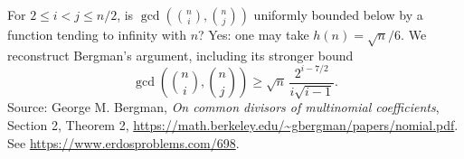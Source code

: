 For \(2\leq i<j\leq n/2\), is
\(\gcd(\binom ni,\binom nj)\) uniformly bounded below by a
function tending to infinity with \(n\)?
Yes: one may take \(h(n)=\sqrt n/6\).
We reconstruct Bergman's argument, including its stronger bound
\[
 \gcd\left(\binom ni,\binom nj\right)
 \geq\sqrt n\,\frac{2^{i-7/2}}{i\sqrt{i-1}}.
\]
Source: George M. Bergman, \emph{On common divisors of multinomial
coefficients}, Section 2, Theorem 2,
\url{https://math.berkeley.edu/~gbergman/papers/nomial.pdf}.
See \url{https://www.erdosproblems.com/698}.
